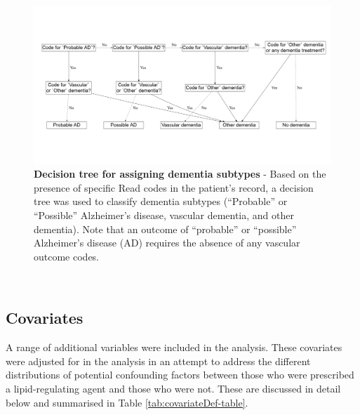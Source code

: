 \documentclass[a4paper, twoside]{templates/ociamthesis}
\begin{document}
\begin{figure}[H]
\includegraphics[width=1\linewidth]{figures/cprd-analysis/decision_tree} \caption[Decision tree for assigning dementia subtypes]{\textbf{Decision tree for assigning dementia subtypes} - Based on the presence of specific Read codes in the patient's record, a decision tree was used to classify dementia subtypes (``Probable'' or ``Possible'' Alzheimer's disease, vascular dementia, and other dementia). Note that an outcome of ``probable'' or ``possible'' Alzheimer's disease (AD) requires the absence of any vascular outcome codes.}\label{fig:decisionTreeFig}
\end{figure}

~

\hypertarget{covariates}{%
\subsection{Covariates}\label{covariates}}

A range of additional variables were included in the analysis. These covariates were adjusted for in the analysis in an attempt to address the different distributions of potential confounding factors between those who were prescribed a lipid-regulating agent and those who were not. These are discussed in detail below and summarised in Table \ref{tab:covariateDef-table}.

~
\end{document}
